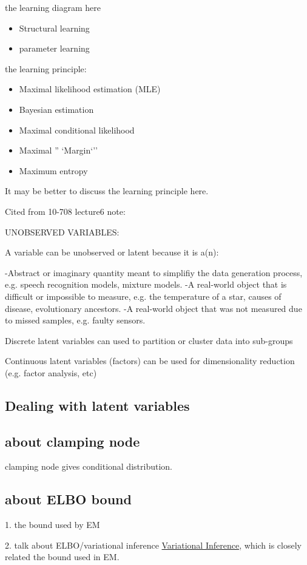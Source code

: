 the learning diagram here
\begin{itemize}
\item Structural learning
\item parameter learning
\end{itemize}


the learning principle:
\begin{itemize}
\item Maximal likelihood estimation (MLE)
\item Bayesian estimation
\item Maximal conditional likelihood
\item Maximal '' `Margin`''
\item Maximum entropy
\end{itemize}


It may be better to discuss the learning principle here.

Cited from 10-708 lecture6 note:

UNOBSERVED VARIABLES:

A variable can be unobserved or latent because it is a(n):

-Abstract or imaginary quantity meant to simplifiy the data generation process, e.g. speech recognition models, mixture models.
-A real-world object that is difficult or impossible to measure, e.g. the temperature of a star, causes of disease, evolutionary ancestors.
-A real-world object that was not measured due to missed samples, e.g. faulty sensors.

Discrete latent variables can used to partition or cluster data into sub-groups

Continuous latent variables (factors) can be used for dimensionality reduction (e.g. factor analysis, etc)
\subsection{Dealing with latent variables}
\subsection{about clamping node}
clamping node gives conditional distribution.

\subsection{about ELBO bound}
1. the bound used by EM

2. talk about ELBO/variational inference \href{https://media.nips.cc/Conferences/2016/Slides/6199-Slides.pdf}{Variational Inference}, which is closely related the bound used in EM.

